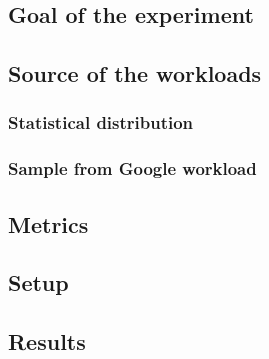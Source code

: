 \subsection{Goal of the experiment}

\subsection{Source of the workloads}
\subsubsection{Statistical distribution}
\subsubsection{Sample from Google workload}
\subsection{Metrics}
\subsection{Setup}
\subsection{Results}

\subsection{}
